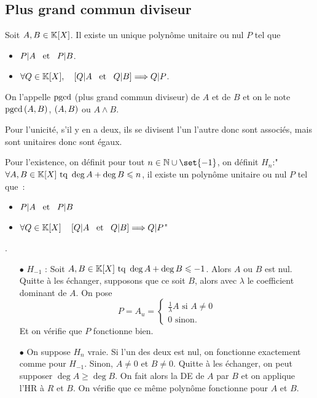 \documentclass{magnolia}
\begin{document}


\subsection{Plus grand commun diviseur}

\begin{definition}
Soit $A,B\in\polyK$. Il existe un unique polynôme unitaire ou nul $P$ tel que
\begin{itemize}
\item $P|A \quad\!\text{et}\quad\! P|B$.
\item $\forall Q\in\polyK \qsep \cro{Q|A \et Q|B} \implique Q|P$.
\end{itemize}
On l'appelle $\operatorname{pgcd}$ (plus grand commun diviseur) de $A$ et de $B$ et on le note
$\operatorname{pgcd}\left(A,B\right)$, $\left(A,B\right)$ ou $A\wedge B$.
\end{definition}

\begin{preuve}
Pour l'unicité, s'il y en a deux, ils se divisent l'un l'autre donc sont associés, mais sont unitaires donc sont égaux.

Pour l'existence, on définit pour tout $n\in \N\cup\set{-1}$, on définit $H_n$:"$\forall A,B \in \polyK \text{ tq } \deg A+\deg B\leq n$, il existe un polynôme unitaire ou nul $P$ tel que~:
\begin{itemize}
\item $P|A \quad\!\text{et}\quad\! P|B$
\item $\forall Q\in\polyK \quad \cro{Q|A \et Q|B} \implique Q|P$"
\end{itemize}.
\begin{itemize}
\item[$\bullet$] $H_{-1}$ : Soit $A,B \in \polyK \text{ tq } \deg A+\deg B\leq -1$. Alors $A$ ou $B$ est nul. Quitte à les échanger, supposons que ce soit $B$, alors avec $\lambda$ le coefficient dominant de $A$. On pose $$P=A_u=\begin{cases}\frac{1}{\lambda}A \text{ si } A\neq 0\\
0 \text{ sinon.}\end{cases}$$
Et on vérifie que $P$ fonctionne bien.
\item[$\bullet$] On suppose $H_n$ vraie. Si l'un des deux est nul, on fonctionne exactement comme pour $H_{-1}$. Sinon, $A\neq 0$ et $B\neq 0$. Quitte à les échanger, on peut supposer $\deg A\geq \deg B$. On fait alors la DE de $A$ par $B$ et on applique l'HR à $R$ et $B$. On vérifie que ce même polynôme fonctionne pour $A$ et $B$.
\end{itemize}
\end{preuve}
\end{document}
